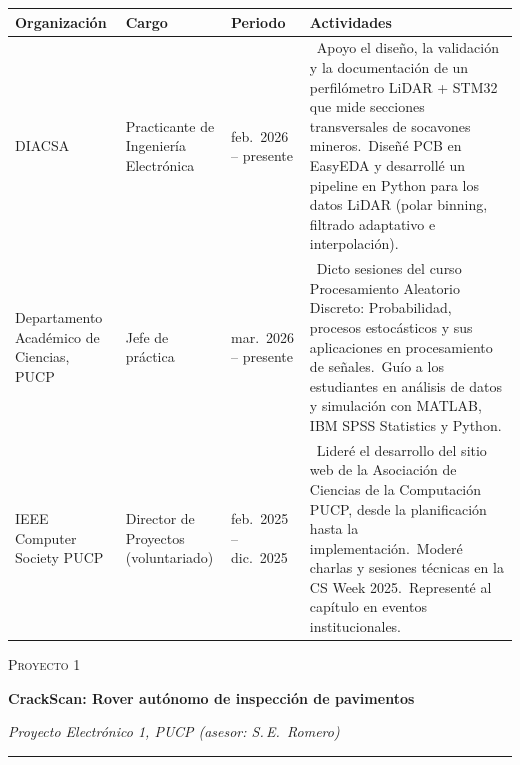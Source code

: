 \documentclass[10pt,a4paper]{article}
\renewcommand{\arraystretch}{1.38}
\newcommand{\sect}[1]{\par\vspace{5pt}{\color{navy}\scshape\bfseries\large #1}\par\vspace{1pt}{\color{rulegray}\hrule height 0.4pt}\vspace{3pt}}
\newcommand{\projecthead}[4]{%
  {\color{navy}\scshape\small Proyecto #1}\par\vspace{-1pt}
  {\color{navy}\LARGE\bfseries #2}\par\vspace{1pt}
  {\small\itshape #3 \quad\textbar\quad #4}\par\vspace{1pt}
  {\color{navy}\hrule height 1pt}\vspace{3pt}}
\newcommand{\bul}{\textbullet\ }
\begin{document}
\sect{Experiencia}
\small
\begin{tabularx}{\linewidth}{|P{2.5cm}|P{2.6cm}|P{1.9cm}|Y|}
\hline
{}\textbf{Organización} & \textbf{Cargo} & \textbf{Periodo} & \textbf{Actividades}\\
\hline
DIACSA & Practicante de Ingeniería Electrónica & feb.\ 2026 -- presente & \bul Apoyo el diseño, la validación y la documentación de un perfilómetro LiDAR + STM32 que mide secciones transversales de socavones mineros.\newline\bul Diseñé PCB en EasyEDA y desarrollé un pipeline en Python para los datos LiDAR (polar binning, filtrado adaptativo e interpolación).\\
\hline
Departamento Académico de Ciencias, PUCP & Jefe de práctica & mar.\ 2026 -- presente & \bul Dicto sesiones del curso Procesamiento Aleatorio Discreto: Probabilidad, procesos estocásticos y sus aplicaciones en procesamiento de señales.\newline\bul Guío a los estudiantes en análisis de datos y simulación con MATLAB, IBM SPSS Statistics y Python.\\
\hline
IEEE Computer Society PUCP & Director de Proyectos (voluntariado) & feb.\ 2025 -- dic.\ 2025 & \bul Lideré el desarrollo del sitio web de la Asociación de Ciencias de la Computación PUCP, desde la planificación hasta la implementación.\newline\bul Moderé charlas y sesiones técnicas en la CS Week 2025.\newline\bul Representé al capítulo en eventos institucionales.\\
\hline
\end{tabularx}

\renewcommand{\arraystretch}{1.38}
\newpage

\projecthead{1}{CrackScan: Rover autónomo de inspección de pavimentos}
  {Proyecto Electrónico 1, PUCP (asesor: S.\,E.~Romero)}{2025}
\vspace{4pt}
\end{document}
